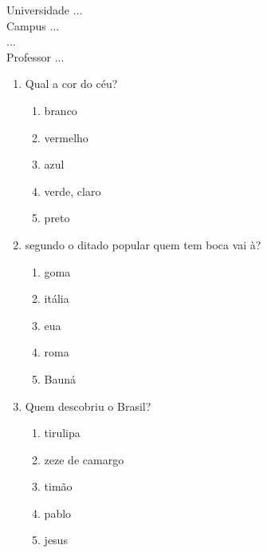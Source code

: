 \documentclass[10pt,a4paper,twocolumn]{report}
\begin{document}
\begin{flushleft}
Universidade ...\\
Campus ...\\
...\\
Professor ...\\
\end{flushleft}




 \begin{enumerate} 
    \item  Qual a cor do céu?





    \begin{enumerate}
    \item  branco

\item  vermelho

\item  azul

\item  verde, claro

\item  preto


    \end{enumerate} 
    \item  segundo o ditado popular quem tem boca vai à?





    \begin{enumerate}
    \item  goma

\item  itália

\item  eua

\item  roma

\item  Bauná


    \end{enumerate} 
    \item  Quem descobriu o Brasil?





    \begin{enumerate}
    \item  tirulipa

\item  zeze de camargo

\item  timão

\item  pablo

\item  jesus


    \end{enumerate}\end{enumerate} 
\end{document}
